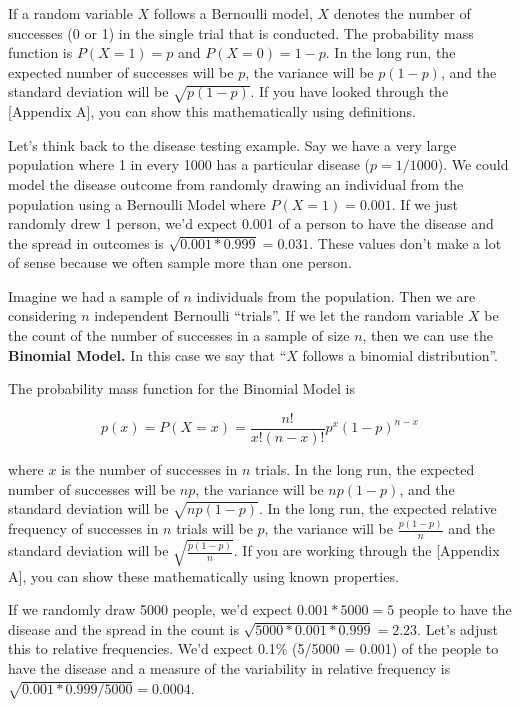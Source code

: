 \documentclass[]{book}
\begin{document}
If a random variable \(X\) follows a Bernoulli model, \(X\) denotes the number of successes (0 or 1) in the single trial that is conducted. The probability mass function is \(P(X = 1) = p\) and \(P(X = 0) = 1-p\). In the long run, the expected number of successes will be \(p\), the variance will be \(p(1-p)\), and the standard deviation will be \(\sqrt{p(1-p)}\). If you have looked through the {[}Appendix A{]}, you can show this mathematically using definitions.

Let's think back to the disease testing example. Say we have a very large population where 1 in every 1000 has a particular disease (\(p = 1/1000\)). We could model the disease outcome from randomly drawing an individual from the population using a Bernoulli Model where \(P(X = 1) = 0.001\). If we just randomly drew 1 person, we'd expect 0.001 of a person to have the disease and the spread in outcomes is \(\sqrt{0.001*0.999} = 0.031\). These values don't make a lot of sense because we often sample more than one person.

Imagine we had a sample of \(n\) individuals from the population. Then we are considering \(n\) independent Bernoulli ``trials''. If we let the random variable \(X\) be the count of the number of successes in a sample of size \(n\), then we can use the \textbf{Binomial Model.} In this case we say that ``\(X\) follows a binomial distribution''.

The probability mass function for the Binomial Model is

\[p(x) = P(X = x) = \frac{n!}{x!(n-x)!}p^x(1-p)^{n-x}\]

where \(x\) is the number of successes in \(n\) trials. In the long run, the expected number of successes will be \(np\), the variance will be \(np(1-p)\), and the standard deviation will be \(\sqrt{np(1-p)}\). In the long run, the expected relative frequency of successes in \(n\) trials will be \(p\), the variance will be \(\frac{p(1-p)}{n}\) and the standard deviation will be \(\sqrt{\frac{p(1-p)}{n}}\). If you are working through the {[}Appendix A{]}, you can show these mathematically using known properties.

If we randomly draw 5000 people, we'd expect \(0.001*5000 = 5\) people to have the disease and the spread in the count is \(\sqrt{5000*0.001*0.999} = 2.23\). Let's adjust this to relative frequencies. We'd expect 0.1\% (5/5000 = 0.001) of the people to have the disease and a measure of the variability in relative frequency is \(\sqrt{0.001*0.999/5000} = 0.0004\).
\end{document}
